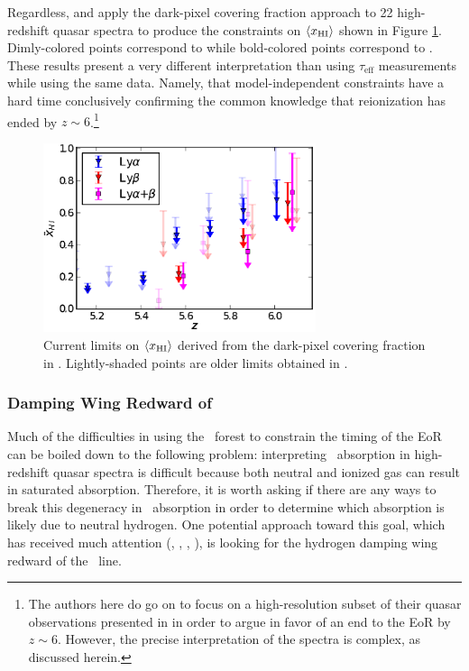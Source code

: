 Regardless, \cite{McGreer:2011dm} and \cite{McGreer:2014qwa} apply the dark-pixel covering fraction approach to 22 high-redshift quasar spectra to produce the constraints on $\langle x_{\text{HI}}\rangle$ shown in Figure \ref{fig:McGreer}. Dimly-colored points correspond to \cite{McGreer:2011dm} while bold-colored points correspond to \cite{McGreer:2014qwa}. These results present a very different interpretation than using $\tau_{\text{eff}}$ measurements while using the same data. Namely, that model-independent constraints have a hard time conclusively confirming the common knowledge that reionization has ended by $z \sim 6$.\footnote{The authors here do go on to focus on a high-resolution subset of their quasar observations presented in \cite{McGreer:2014qwa} in order to argue in favor of an end to the EoR by $z \sim 6$. However, the precise interpretation of the spectra is complex, as discussed herein.} 

\begin{figure}[!p]
  \centering
  \includegraphics[width=8cm]{xhi_newdata.eps}
  \caption{Current limits on $\langle x_{\text{HI}}\rangle$ derived from the dark-pixel covering fraction in \cite{McGreer:2014qwa}. Lightly-shaded points are older limits obtained in \cite{McGreer:2011dm}.}
  \label{fig:McGreer}
\end{figure}


\clearpage
\subsubsection{Damping Wing Redward of \lya}\label{sec:IntroDampingWing}

Much of the difficulties in using the \lya\ forest to constrain the timing of the EoR can be boiled down to the following problem: interpreting \lya\ absorption in high-redshift quasar spectra is difficult because both neutral and ionized gas can result in saturated absorption. Therefore, it is worth asking if there are any ways to break this degeneracy in \lya\ absorption in order to determine which absorption is likely due to neutral hydrogen. One potential approach toward this goal, which has received much attention (\citealt{Chornock:2013una}, \citealt{Chornock:2014fva}, \citealt{Mortlock2011}, \citealt{Bolton:2011vb}), is looking for the hydrogen damping wing redward of the \lya\ line. 


